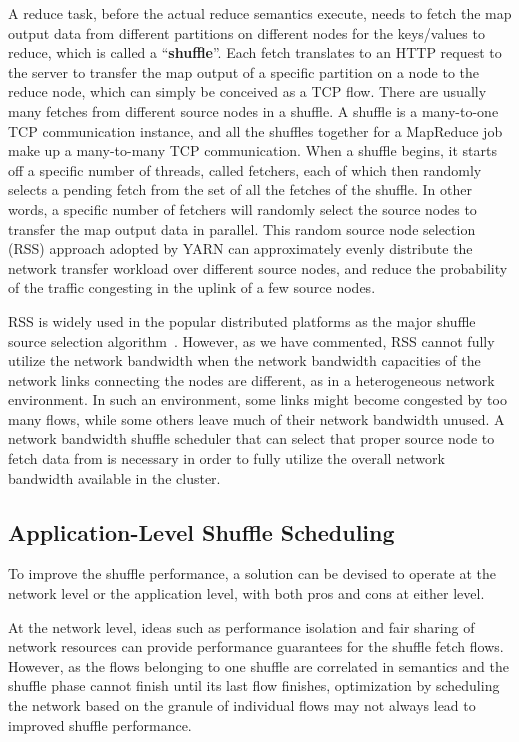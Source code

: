 \documentclass[10pt,journal,compsoc]{IEEEtran}
\begin{document}
A reduce task, before the actual reduce semantics execute,
needs to fetch the map output data from
different partitions on different nodes for the keys/values to reduce,
which is called a ``\textbf{shuffle}''.
Each fetch translates to an HTTP request to the server to transfer the
map output of a specific partition on a node to the reduce node,
which can simply be conceived as a TCP flow. 
There are usually many fetches from different source nodes in a shuffle. 
A shuffle is a many-to-one TCP communication instance, 
and all the shuffles together for a MapReduce job
make up a many-to-many TCP communication. 
When a shuffle begins, it starts off a specific number of threads, called
fetchers, each of which then randomly selects a pending fetch from the set
of all the fetches of the shuffle.
In other words, a specific number of fetchers will randomly select the
source nodes to transfer the map output data in parallel. 
This random source node selection (RSS) approach adopted by YARN can
approximately evenly distribute the network transfer workload
over different source nodes, and reduce the probability of the traffic
congesting in the uplink of a few source nodes.


RSS is widely used in the popular distributed platforms as the major shuffle 
source selection algorithm~\cite{zaharia2012resilient, vavilapalli2013apache}. 
However, as we have commented,
RSS cannot fully utilize the network bandwidth
when the network bandwidth capacities of
the network links connecting the nodes are different, as in
a heterogeneous network environment.
In such an environment, some links might become congested by too many flows,
while some others leave much of their network bandwidth unused.
A network bandwidth shuffle scheduler that can select that proper
source node to fetch data from is necessary in order
to fully utilize the overall network bandwidth available in the cluster. 


\subsection{Application-Level Shuffle Scheduling}\label{section:application_level}
To improve the shuffle performance, a solution can be devised to operate at the network level or the application level, with both pros and cons
at either level. 

At the network level, ideas such as
performance isolation \cite{greenberg2009vl2}
and fair sharing of network resources \cite{shieh2011sharing,popa2012faircloud} 
can provide performance guarantees for the shuffle fetch flows.
However, as the flows belonging to one shuffle are correlated in
semantics and the shuffle phase cannot finish until its last flow
finishes, optimization by scheduling the network based on the granule of
individual flows may not always lead to improved shuffle performance.
\end{document}
